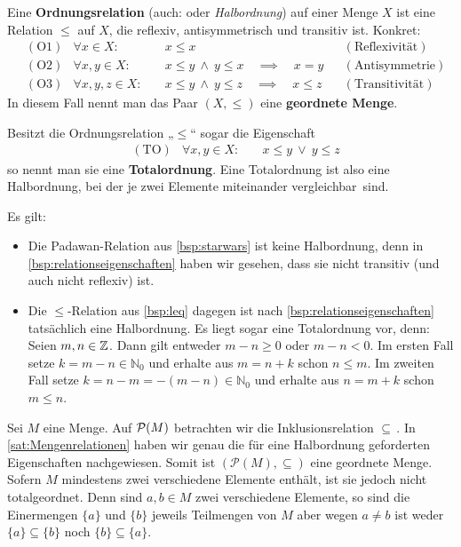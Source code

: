 \begin{de}[Ordnungsrelationen]
	Eine \textbf{Ordnungsrelation} (auch:  oder \emph{Halbordnung}) auf einer Menge $X$ ist eine Relation $\leq$ auf $X$, die reflexiv, antisymmetrisch und transitiv ist. Konkret:
\begin{align*}
 & (\text{O1}) & \forall x\in X:&\quad x\leq x && (\text{Reflexivität}) \\
& (\text{O2}) & \forall x,y\in X:&\quad  x\leq y\ \wedge\  y\leq x \quad\implies\quad x=y && (\text{Antisymmetrie}) \\
& (\text{O3}) & \forall x,y,z\in X:&\quad x\leq y\ \wedge\ y\leq z \quad\implies\quad x\leq z && (\text{Transitivität})
 \end{align*}
In diesem Fall nennt man das Paar $(X,\leq)$ eine \textbf{geordnete Menge}.

Besitzt die Ordnungsrelation „$\leq$“ sogar die Eigenschaft
\begin{align*}
 & (\text{TO}) & \forall x,y \in X:&\quad x\leq y\ \vee\ y\leq z 
\end{align*}
so nennt man sie eine \textbf{Totalordnung}. Eine Totalordnung ist also eine Halbordnung, bei der je zwei Elemente miteinander \glqq vergleichbar\grqq\, sind.
\end{de}

\begin{bsp} Es gilt:
\begin{itemize}
 \item Die Padawan-Relation aus \cref{bsp:starwars} ist keine Halbordnung, denn in \cref{bsp:relationseigenschaften} haben wir gesehen, dass sie nicht transitiv (und auch nicht reflexiv) ist.
 \item Die $\leq$-Relation aus \cref{bsp:leq} dagegen ist nach \cref{bsp:relationseigenschaften} tatsächlich eine Halbordnung. Es liegt sogar eine Totalordnung vor, denn: Seien $m,n\in{\mathbb Z}$. Dann gilt entweder $m-n\geq0$ oder $m-n<0$. Im ersten Fall setze $k=m-n\in\mathbb{N}_0$ und erhalte aus $m=n+k$ schon $n\leq m$. Im zweiten Fall setze $k=n-m=-(m-n)\in\mathbb{N}_0$ und erhalte aus $n=m+k$ schon $m\leq n$.
\end{itemize}
\end{bsp}

\begin{bsp}[Teilmengenrelation]
	Sei $M$ eine Menge. Auf ${\mathcal P}(M)$ betrachten wir die Inklusionsrelation \glqq$\subseteq$\grqq\,. In \cref{sat:Mengenrelationen} haben wir genau die für eine Halbordnung geforderten Eigenschaften nachgewiesen. Somit ist $(\mathcal{P}(M),\subseteq)$ eine geordnete Menge. \\[0.5em]
Sofern $M$ mindestens zwei verschiedene Elemente enthält, ist sie jedoch nicht totalgeordnet. Denn sind $a,b\in M$ zwei verschiedene Elemente, so sind die Einermengen $\{a\}$ und $\{b\}$ jeweils Teilmengen von $M$ aber wegen $a\neq b$ ist weder $\{a\}\subseteq \{b\}$ noch $\{b\}\subseteq \{a\}$.
\end{bsp}





